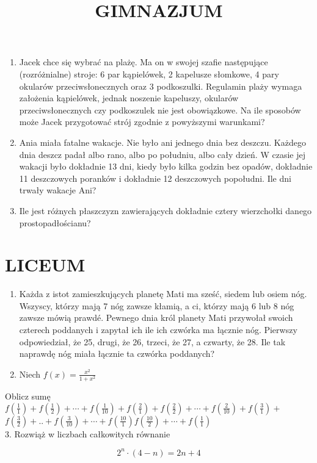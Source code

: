 \documentclass[10pt]{article}
\title{GIMNAZJUM }
\author{}
\date{}
\begin{document}
\maketitle
\begin{enumerate}
  \item Jacek chce się wybrać na plażę. Ma on w swojej szafie następujące (rozróżnialne) stroje: 6 par kąpielówek, 2 kapelusze słomkowe, 4 pary okularów przeciwsłonecznych oraz 3 podkoszulki. Regulamin plaży wymaga założenia kąpielówek, jednak noszenie kapeluszy, okularów przeciwsłonecznych czy podkoszulek nie jest obowiązkowe. Na ile sposobów może Jacek przygotować strój zgodnie z powyższymi warunkami?
  \item Ania miała fatalne wakacje. Nie było ani jednego dnia bez deszczu. Każdego dnia deszcz padał albo rano, albo po południu, albo cały dzień. W czasie jej wakacji było dokładnie 13 dni, kiedy było kilka godzin bez opadów, dokładnie 11 deszczowych poranków i dokładnie 12 deszczowych popołudni. Ile dni trwały wakacje Ani?
  \item Ile jest różnych płaszczyzn zawierających dokładnie cztery wierzchołki danego prostopadłościanu?
\end{enumerate}

\section*{LICEUM}
\begin{enumerate}
  \item Każda z istot zamieszkujących planetę Mati ma sześć, siedem lub osiem nóg. Wszyscy, którzy mają 7 nóg zawsze kłamią, a ci, którzy mają 6 lub 8 nóg zawsze mówią prawdé. Pewnego dnia król planety Mati przywołał swoich czterech poddanych i zapytał ich ile ich czwórka ma łącznie nóg. Pierwszy odpowiedział, że 25, drugi, że 26, trzeci, że 27, a czwarty, że 28. Ile tak naprawdę nóg miała łącznie ta czwórka poddanych?
  \item Niech \(f(x)=\frac{x^{2}}{1+x^{2}}\)
\end{enumerate}

Oblicz sumę \(f\left(\frac{1}{1}\right)+f\left(\frac{1}{2}\right)+\cdots+f\left(\frac{1}{10}\right)+f\left(\frac{2}{1}\right)+f\left(\frac{2}{2}\right)+\cdots+f\left(\frac{2}{10}\right)+f\left(\frac{3}{1}\right)+\) \(f\left(\frac{3}{2}\right)+. .+f\left(\frac{3}{10}\right)+\cdots+f\left(\frac{10}{1}\right) f\left(\frac{10}{2}\right)+\cdots+f\left(\frac{1}{1}\right)\)\\
3. Rozwiąż w liczbach całkowitych równanie

\[
2^{n} \cdot(4-n)=2 n+4
\]
\end{document}
